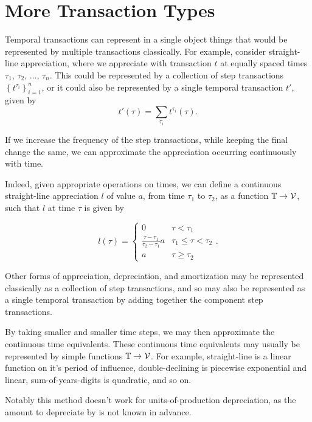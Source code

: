 \section{More Transaction Types}

Temporal transactions can represent in a single object things that would be represented by multiple transactions classically.
For example, consider straight-line appreciation, where we appreciate with transaction $t$ at equally spaced times $\tau_1$, $\tau_2$, ..., $\tau_n$.
This could be represented by a collection of step transactions $\left\{t^{\tau_i}\right\}_{i = 1}^n$,
or it could also be represented by a single temporal transaction $t'$, given by
\begin{equation*}
    t'(\tau) = \sum_{\tau_i} t^{\tau_i}(\tau).
\end{equation*}

If we increase the frequency of the step transactions, while keeping the final change the same,
we can approximate the appreciation occurring continuously with time.

Indeed, given appropriate operations on times,
we can define a continuous straight-line appreciation $l$ of value $a$, from time $\tau_1$ to $\tau_2$,
as a function $\mathbb{T} \to \mathcal{V}$, such that $l$ at time $\tau$ is given by

\begin{equation*}
    l(\tau) =
    \begin{cases}
        0 & \tau < \tau_1 \\
        \frac{\tau - \tau_1}{\tau_2 - \tau_1} a & \tau_1 \le \tau < \tau_2 \\
        a & \tau \ge \tau_2
    \end{cases}.
\end{equation*}

Other forms of appreciation, depreciation, and amortization may be represented classically as a collection of step transactions,
and so may also be represented as a single temporal transaction by adding together the component step transactions.

By taking smaller and smaller time steps, we may then approximate the continuous time equivalents.
These continuous time equivalents may usually be represented by simple functions $\mathbb{T} \to \mathcal{V}$.
For example, straight-line is a linear function on it's period of influence,
double-declining is piecewise exponential and linear,
sum-of-years-digits is quadratic,
and so on.

Notably this method doesn't work for units-of-production depreciation, as the amount to depreciate by is not known in advance.
